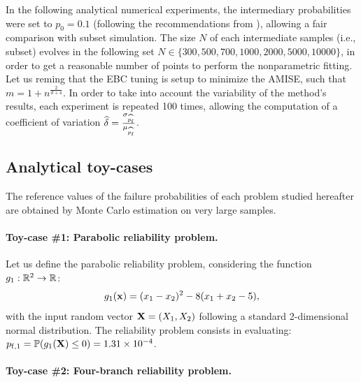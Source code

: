 In the following analytical numerical experiments, the intermediary probabilities were set to $p_0=0.1$ (following the recommendations from \citet{AuBeck2001}), allowing a fair comparison with subset simulation. 
The size $N$ of each intermediate samples (i.e., subset) evolves in the following set $N\in \{300, 500, 700, 1000, 2000, 5000, 10 000\}$, in order to get a reasonable number of points to perform the nonparametric fitting. 
Let us reming that the EBC tuning is setup to minimize the AMISE, such that $m = 1 + n^{\frac{2}{d+4}}$. 
In order to take into account the variability of the method's results, each experiment is repeated 100 times, allowing the computation of a coefficient of variation $\widehat{\delta} = \frac{\sigma_{\widehat{p_\mathrm{f}}}}{\mu_{\widehat{p_\mathrm{f}}}}$. 

\subsection{Analytical toy-cases}
The reference values of the failure probabilities of each problem studied hereafter are obtained by Monte Carlo estimation on very large samples. 

\paragraph{Toy-case \#1: Parabolic reliability problem.}

Let us define the parabolic reliability problem, considering the function $g_1: \mathbb{R}^2 \rightarrow \mathbb{R}$:
\begin{equation}
    g_1({\bf x})= (x_1 - x_2) ^ 2 - 8 (x_1 + x_2 - 5),
\end{equation}
with the input random vector ${\bf X} = (X_1, X_2)$ following a standard 2-dimensional normal distribution. 
The reliability problem consists in evaluating: $p_{\mathrm{f}, 1} = \mathbb{P} ( g_1({\bf X}) \leq 0 ) = 1.31 \times 10^{-4}$.

\paragraph{Toy-case \#2: Four-branch reliability problem.}

